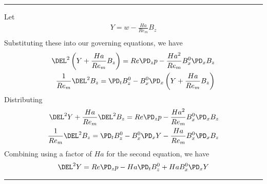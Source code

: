 \documentclass[11pt]{article}
\begin{document}
\noindent \rule{\textwidth}{1pt}
Let
\begin{equation}\begin{aligned}
Y = w - \frac{Ha}{Re_m} B_z \\
\end{aligned} \end{equation}
Substituting these into our governing equations, we have
\begin{equation}\begin{aligned}
\DEL^2 \left( Y + \frac{Ha}{Re_m} B_z \right) = Re\PD_z p - \frac{Ha^2}{Re_m} B_x^0 \PD_x B_z \\
\frac{1}{Re_m} \DEL^2 B_z = \PD_t B_z^0 - B_x^0 \PD_x \left( Y + \frac{Ha}{Re_m} B_z \right) \\
\end{aligned} \end{equation}
Distributing
\begin{equation}\begin{aligned}
\DEL^2 Y + \frac{Ha}{Re_m} \DEL^2 B_z = Re\PD_z p - \frac{Ha^2}{Re_m} B_x^0 \PD_x B_z \\
\frac{1}{Re_m} \DEL^2 B_z = \PD_t B_z^0 - B_x^0 \PD_x Y - \frac{Ha}{Re_m} B_x^0 \PD_x B_z \\
\end{aligned} \end{equation}
Combining using a factor of $Ha$ for the second equation, we have
\begin{equation}\begin{aligned}
\DEL^2 Y = Re\PD_z p - Ha \PD_t B_z^0 + Ha B_x^0 \PD_x Y \\
\end{aligned} \end{equation}
\noindent \rule{\textwidth}{1pt}
\end{document}

